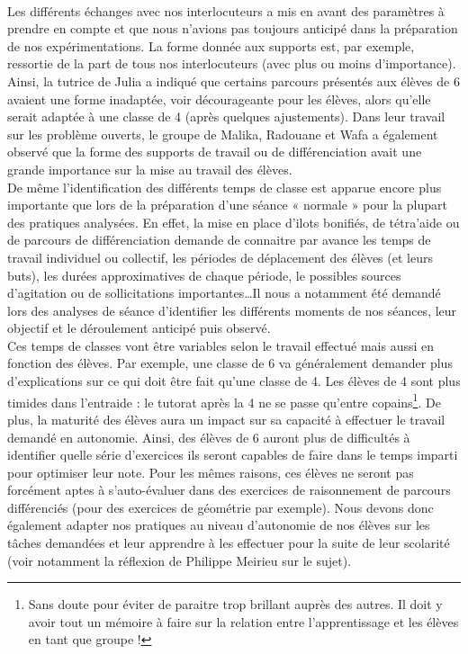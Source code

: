 \paragraph*{}
Les différents échanges avec nos interlocuteurs a mis en avant des paramètres à prendre en compte et que nous n'avions pas toujours anticipé dans la préparation de nos expérimentations. La forme donnée aux supports est, par exemple, ressortie de la part de tous nos interlocuteurs (avec plus ou moins d'importance). Ainsi, la tutrice de Julia a indiqué que certains parcours présentés aux élèves de 6 avaient une forme inadaptée, voir décourageante pour les élèves, alors qu'elle serait adaptée à une classe de 4 (après quelques ajustements). Dans leur travail sur les problème ouverts, le groupe de Malika, Radouane et Wafa a également observé que la forme des supports de travail ou de différenciation avait une grande importance sur la mise au travail des élèves.\\
De même l'identification des différents temps de classe est apparue encore plus importante que lors de la préparation d'une séance « normale » pour la plupart des pratiques analysées. En effet, la mise en place d'ilots bonifiés, de tétra'aide ou de parcours de différenciation demande de connaitre par avance les temps de travail individuel ou collectif, les périodes de déplacement des élèves (et leurs buts), les durées approximatives de chaque période, le possibles sources d'agitation ou de sollicitations importantes\ldots Il nous a notamment été demandé lors des analyses de séance d'identifier les différents moments de nos séances, leur objectif et le déroulement anticipé puis observé.\\
Ces temps de classes vont être variables selon le travail effectué mais aussi en fonction des élèves. Par exemple, une classe de 6 va généralement demander plus d'explications sur ce qui doit être fait qu'une classe de 4. Les élèves de 4 sont plus timides dans l'entraide : le tutorat après la 4 ne se passe qu'entre copains\footnote{Sans doute pour éviter de paraitre trop brillant auprès des autres. Il doit y avoir tout un mémoire à faire sur
la relation entre l'apprentissage et les élèves en tant que groupe !}.
De plus, la maturité des élèves aura un impact sur sa capacité à effectuer le travail demandé en autonomie. Ainsi, des élèves de 6 auront plus de difficultés à identifier quelle série d'exercices ils seront capables de faire dans le temps imparti pour optimiser leur note. Pour les mêmes raisons, ces élèves ne seront pas forcément aptes à s'auto-évaluer dans des exercices de raisonnement de parcours différenciés (pour des exercices de géométrie par exemple). Nous devons donc également adapter nos pratiques au niveau d'autonomie de nos élèves sur les tâches demandées et leur apprendre à les effectuer pour la suite de leur scolarité (voir notamment la réflexion de Philippe Meirieu\cite{Meirieu_autonomie} sur le sujet).\\

